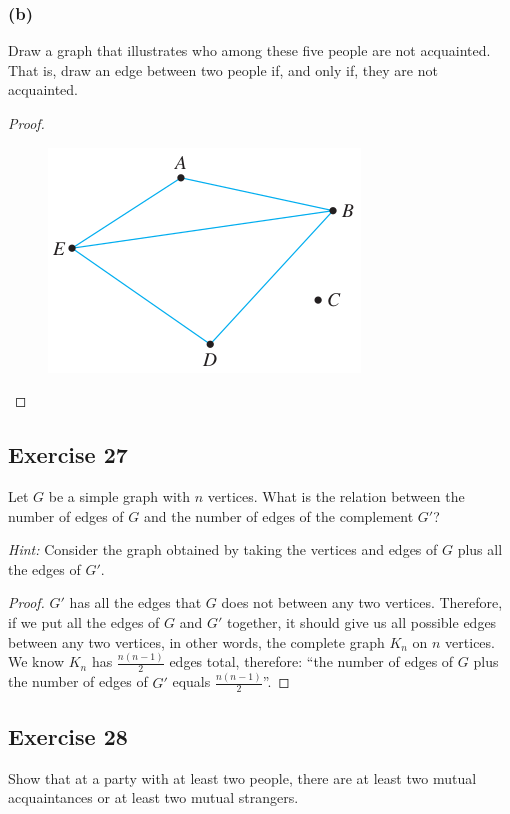 \documentclass[14pt]{extarticle}
\begin{document}
\subsubsection{(b)}
Draw a graph that illustrates who among these five people are not acquainted. That is, draw an edge between two people if, 
and only if, they are not acquainted.

\begin{proof}
\begin{figure}[ht!]
\centering
\includegraphics[scale=0.5]{../images/10.1.26.b.png}
\end{figure}
\end{proof}

\subsection{Exercise 27}
Let \(G\) be a simple graph with \(n\) vertices. What is the relation between the number of edges of \(G\) and the number 
of edges of the complement \(G'\)?

{\it Hint:} Consider the graph obtained by taking the vertices and edges of \(G\) plus all the edges of \(G'\).

\begin{proof}
\(G'\) has all the edges that \(G\) does not between any two vertices. Therefore, if we put all the edges of \(G\) and 
\(G'\) together, it should give us all possible edges between any two vertices, in other words, the complete graph \(K_n\) 
on \(n\) vertices. We know \(K_n\) has \(\frac{n(n-1)}{2}\) edges total, therefore: ``the number of edges of \(G\) plus 
the number of edges of \(G'\) equals \(\frac{n(n-1)}{2}\)''.
\end{proof}

\subsection{Exercise 28}
Show that at a party with at least two people, there are at least two mutual acquaintances or at least two mutual 
strangers.
\end{document}
